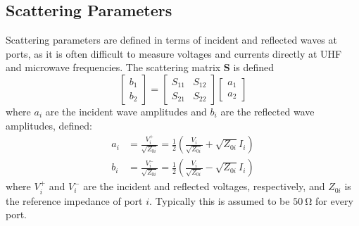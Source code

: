 \documentclass{article}
\begin{document}
\subsection{Scattering Parameters}
Scattering parameters are defined in terms of incident and reflected
waves at ports, as it is often difficult to measure voltages and
currents directly at UHF and microwave frequencies. The scattering
matrix \(\symbf{S}\) is defined
\begin{equation*}
    \begin{bmatrix}
        b_1 \\
        b_2
    \end{bmatrix}
    =
    \begin{bmatrix}
        S_{11} & S_{12} \\
        S_{21} & S_{22}
    \end{bmatrix}
    \begin{bmatrix}
        a_1 \\
        a_2
    \end{bmatrix}
\end{equation*}
where \(a_i\) are the incident wave amplitudes and \(b_i\) are the
reflected wave amplitudes, defined:
\begin{align*}
    a_i & = \frac{V_i^+}{\sqrt{Z_{0i}}} = \frac{1}{2} \left( \frac{V_i}{\sqrt{Z_{0i}}} + \sqrt{Z_{0i}} I_i \right) \\
    b_i & = \frac{V_i^-}{\sqrt{Z_{0i}}} = \frac{1}{2} \left( \frac{V_i}{\sqrt{Z_{0i}}} - \sqrt{Z_{0i}} I_i \right)
\end{align*}
where \(V_i^+\) and \(V_i^-\) are the incident and reflected voltages,
respectively, and \(Z_{0i}\) is the reference impedance of port
\(i\). Typically this is assumed to be \(\qty{50}{\ohm}\) for every port.
\end{document}
